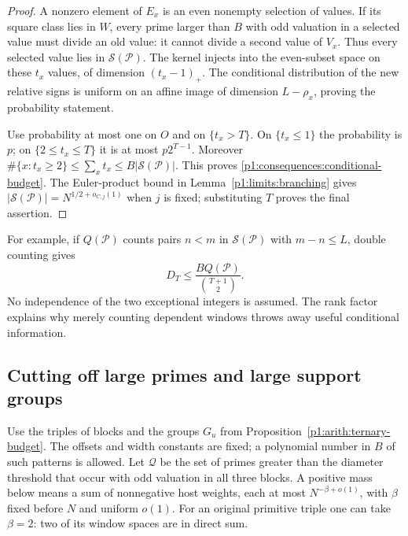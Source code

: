 \begin{proof}
A nonzero element of $E_x$ is an even nonempty selection of
values. If its square class lies in $W$, every prime larger
than $B$ with odd valuation in a selected value must divide
an old value: it cannot divide a second value of $V_x$.
Thus every selected value lies in $\mathcal S(\mathcal P)$.
The kernel injects into the even-subset space on these $t_x$
values, of dimension $(t_x-1)_+$. The conditional distribution
of the new relative signs is uniform on an affine image of
dimension $L-\rho_x$, proving the probability statement.

Use probability at most one on $O$ and on $\{t_x>T\}$.
On $\{t_x\le1\}$ the probability is $p$; on
$\{2\le t_x\le T\}$ it is at most $p2^{T-1}$.
Moreover $\#\{x:t_x\ge2\}\le\sum_xt_x
\le B|\mathcal S(\mathcal P)|$.
This proves \eqref{p1:consequences:conditional-budget}.
The Euler-product bound in Lemma~\ref{p1:limits:branching}
gives $|\mathcal S(\mathcal P)|=N^{1/2+o_{C,j}(1)}$ when
$j$ is fixed; substituting $T$ proves the final assertion.
\end{proof}

For example, if $Q(\mathcal P)$ counts pairs $n<m$ in
$\mathcal S(\mathcal P)$ with $m-n\le L$, double counting gives
\[
 D_T\le\frac{B Q(\mathcal P)}{\binom{T+1}{2}}.
\]
No independence of the two exceptional integers is assumed.
The rank factor explains why merely counting dependent windows
throws away useful conditional information.

\subsection{Cutting off large primes and large support groups}

Use the triples of blocks and the groups $G_u$ from
Proposition~\ref{p1:arith:ternary-budget}. The offsets and
width constants are fixed; a polynomial number in $B$ of
such patterns is allowed. Let $\mathcal Q$ be the set of
primes greater than the diameter threshold that occur with
odd valuation in all three blocks. A positive mass below
means a sum of nonnegative host weights, each at most
$N^{-\beta+o(1)}$, with $\beta$ fixed before $N$ and uniform
$o(1)$. For an original
primitive triple one can take $\beta=2$: two of its
window spaces are in direct sum.

